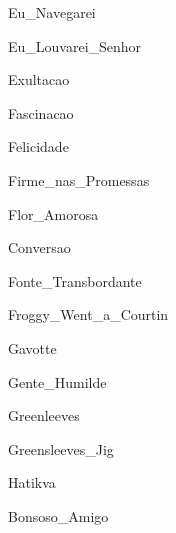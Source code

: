 \documentclass{scrartcl}
\begin{document}

{Eu_Navegarei}


{Eu_Louvarei_Senhor}


{Exultacao}


{Fascinacao}


{Felicidade}


{Firme_nas_Promessas}


{Flor_Amorosa}


{Conversao}


{Fonte_Transbordante}


{Froggy_Went_a_Courtin}


{Gavotte}


{Gente_Humilde}


{Greenleeves}


{Greensleeves_Jig}


{Hatikva}

    
{Bonsoso_Amigo}
\end{document}
